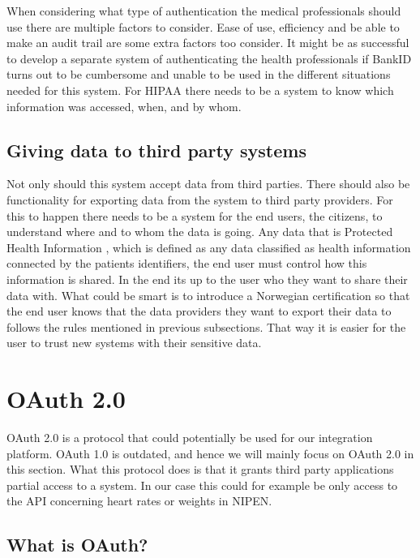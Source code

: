 When considering what type of authentication the medical professionals should use there are multiple factors to consider. 
Ease of use, efficiency and be able to make an audit trail are some extra factors too consider.
It might be as successful to develop a separate system of authenticating the health professionals if BankID turns out to be cumbersome and unable to be used in the different situations needed for this system. 
For HIPAA there needs to be a system to know which information was accessed, when, and by whom. \cite{Audit}

\subsection{Giving data to third party systems}
Not only should this system accept data from third parties. 
There should also be functionality for exporting data from the system to third party providers. 
For this to happen there needs to be a system for the end users, the citizens, to understand where and to whom the data is going.
Any data that is Protected Health Information \cite{PHI}, which is defined as any data classified as health information connected by the patients identifiers, the end user must control how this information is shared. 
In the end its up to the user who they want to share their data with.
What could be smart is to introduce a Norwegian certification so that the end user knows that the data providers they want to export their data to follows the rules mentioned in previous subsections. 
That way it is easier for the user to trust new systems with their sensitive data.

\section{OAuth 2.0}

OAuth 2.0 is a protocol that could potentially be used for our integration platform.
OAuth 1.0 is outdated, and hence we will mainly focus on OAuth 2.0 in this section.
What this protocol does is that it grants third party applications partial access to a system.
In our case this could for example be only access to the API concerning heart rates or weights in NIPEN.

\subsection{What is OAuth?}

